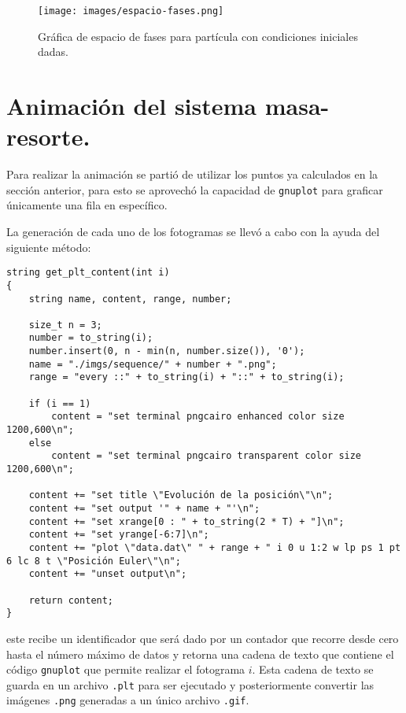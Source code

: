\documentclass[10pt]{article}
\begin{document}
    \begin{figure}[H]
        \centering
        \texttt{[image: images/espacio-fases.png]}
        \caption{Gráfica de espacio de fases para partícula con condiciones iniciales dadas.}
        \label{img}
    \end{figure}
    
    
    \section{Animación del sistema masa-resorte.}
    
    Para realizar la animación se partió de utilizar los puntos ya calculados en la sección anterior, para esto se aprovechó la capacidad de \texttt{gnuplot} para graficar únicamente una fila en específico.
    
    La generación de cada uno de los fotogramas se llevó a cabo con la ayuda del siguiente método:
    
    \begin{verbatim}
string get_plt_content(int i)
{
    string name, content, range, number;

    size_t n = 3;
    number = to_string(i);
    number.insert(0, n - min(n, number.size()), '0');
    name = "./imgs/sequence/" + number + ".png";
    range = "every ::" + to_string(i) + "::" + to_string(i);

    if (i == 1)
        content = "set terminal pngcairo enhanced color size 1200,600\n";
    else
        content = "set terminal pngcairo transparent color size 1200,600\n";

    content += "set title \"Evolución de la posición\"\n";
    content += "set output '" + name + "'\n";
    content += "set xrange[0 : " + to_string(2 * T) + "]\n";
    content += "set yrange[-6:7]\n";
    content += "plot \"data.dat\" " + range + " i 0 u 1:2 w lp ps 1 pt 6 lc 8 t \"Posición Euler\"\n";
    content += "unset output\n";

    return content;
}
    \end{verbatim}
    
    este recibe un identificador que será dado por un contador que recorre desde cero hasta el número máximo de datos y retorna una cadena de texto que contiene el código \texttt{gnuplot} que permite realizar el fotograma $i$. Esta cadena de texto se guarda en un archivo \texttt{.plt} para ser ejecutado y posteriormente convertir las imágenes \texttt{.png} generadas a un único archivo \texttt{.gif}.\\
\end{document}
